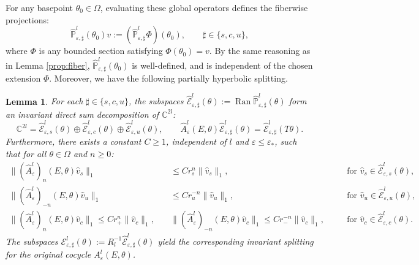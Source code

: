 \documentclass[reqno,11pt]{amsart}
\newtheorem{lemma}{Lemma}[section]
\begin{document}
For any basepoint $\theta_0\in\Omega$, evaluating these global operators defines the fiberwise projections:
$$
\widehat{\mathbb P}^l_{\varepsilon,\sharp}(\theta_0)v := (\widehat{\mathbb P}^l_{\varepsilon,\sharp}\Phi)(\theta_0), \qquad \sharp \in \{s, c, u\},
$$
where $\Phi$ is any bounded section satisfying $\Phi(\theta_0)=v$. By the same reasoning as in Lemma \ref{prop:fiber}, $\widehat{\mathbb P}^l_{\varepsilon,\sharp}(\theta_0)$  is well-defined, and is independent of the chosen extension $\Phi$. Moreover, we have the following  partially hyperbolic splitting.

\begin{lemma}\label{prop:fibe2}
For each $\sharp \in \{s, c, u\}$, the subspaces $\widehat{\mathcal E}_{\varepsilon,\sharp}^l(\theta) := \operatorname{Ran}\widehat{\mathbb P}^l_{\varepsilon,\sharp}(\theta)$ form an invariant direct sum decomposition of $\mathbb{C}^{2l}$:
$$
\mathbb{C}^{2l} = \widehat{\mathcal E}^{l}_{\varepsilon,s}(\theta) \oplus \widehat{\mathcal E}^{l}_{\varepsilon,c}(\theta) \oplus \widehat{\mathcal E}^{l}_{\varepsilon,u}(\theta),
\qquad
\widehat A_{\varepsilon}^{l}(E,\theta) \widehat{\mathcal E}_{\varepsilon,\sharp}^l(\theta) = \widehat{\mathcal E}_{\varepsilon,\sharp}^l(T\theta).
$$
Furthermore, there exists a constant $C\ge 1$, independent of $l$ and $\varepsilon\leq \varepsilon_*$, such that for all $\theta\in\Omega$ and $n\ge 0$:
\begin{equation*}
\begin{aligned}
\|(\widehat A^{l}_{\varepsilon})_n(E, \theta)\widehat v_s\|_{1} &\le C r_s^n \|\widehat v_s\|_{1}, &&\quad \text{for } \widehat v_s\in \widehat{\mathcal E}^{l}_{\varepsilon,s}(\theta), \\
\|(\widehat A^{l}_\varepsilon)_{-n}(E,\theta)\widehat v_u\|_{1} &\le C r_u^{-n} \|\widehat v_u\|_{1}, &&\quad \text{for } \widehat v_u\in \widehat{\mathcal E}^{l}_{\varepsilon,u}(\theta), \\
\|(\widehat A^{l}_\varepsilon)_{n}(E,\theta)\widehat v_c\|_{1} \le C r_+^{n} \|\widehat v_c\|_{1},\quad
&\|(\widehat A^{l}_\varepsilon)_{-n}(E,\theta)\widehat v_c\|_{1} \le C r_-^{-n} \|\widehat v_c\|_{1}, &&\quad \text{for } \widehat v_c\in \widehat{\mathcal E}^{l}_{\varepsilon,c}(\theta).
\end{aligned}
\end{equation*}
The subspaces $\mathcal E_{\varepsilon,\sharp}^l(\theta) := R_l^{-1}\widehat{\mathcal E}_{\varepsilon,\sharp}^l(\theta)$ yield the corresponding invariant splitting for the original cocycle $A_{\varepsilon}^{l}(E,\theta)$.
\end{lemma}
\end{document}
